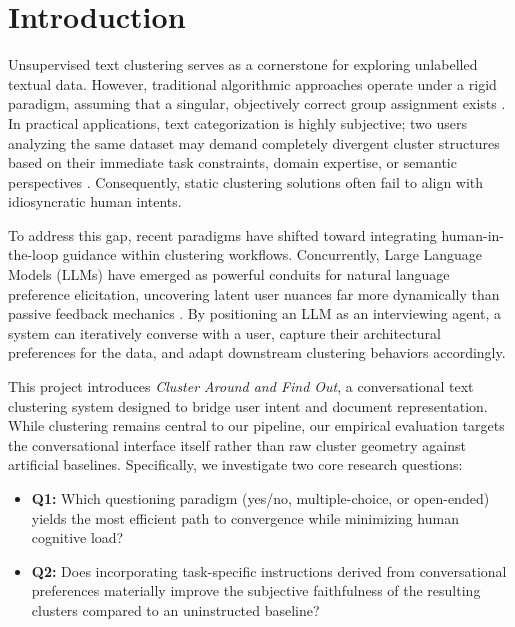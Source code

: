 \section{Introduction}
\label{sec:intro}

Unsupervised text clustering serves as a cornerstone for exploring unlabelled textual data.
However, traditional algorithmic approaches operate under a rigid paradigm, assuming that a singular, objectively correct group assignment exists \cite{clusterllm, dial_in_llm}.
In practical applications, text categorization is highly subjective; 
two users analyzing the same dataset may demand completely divergent cluster structures based on their immediate task constraints, domain expertise, or semantic perspectives \cite{eliciting_human_preferences}. 
Consequently, static clustering solutions often fail to align with idiosyncratic human intents.

To address this gap, recent paradigms have shifted toward integrating human-in-the-loop guidance within clustering workflows.
Concurrently, Large Language Models (LLMs) have emerged as powerful conduits for natural language preference elicitation, uncovering latent user nuances far more dynamically than passive feedback mechanics \cite{eliciting_human_preferences, to_gate, asking_clarifying_questions}. 
By positioning an LLM as an interviewing agent, a system can iteratively converse with a user, capture their architectural preferences for the data, and adapt downstream clustering behaviors accordingly.

This project introduces \textit{Cluster Around and Find Out}, a conversational text clustering system designed to bridge user intent and document representation. 
While clustering remains central to our pipeline, our empirical evaluation targets the conversational interface itself rather than raw cluster geometry against artificial baselines. 
Specifically, we investigate two core research questions:
\begin{itemize}
    \item \textbf{Q1:} Which questioning paradigm (yes/no, multiple-choice, or open-ended) yields the most efficient path to convergence while minimizing human cognitive load?
    \item \textbf{Q2:} Does incorporating task-specific instructions derived from conversational preferences materially improve the subjective faithfulness of the resulting clusters compared to an uninstructed baseline?
\end{itemize}

